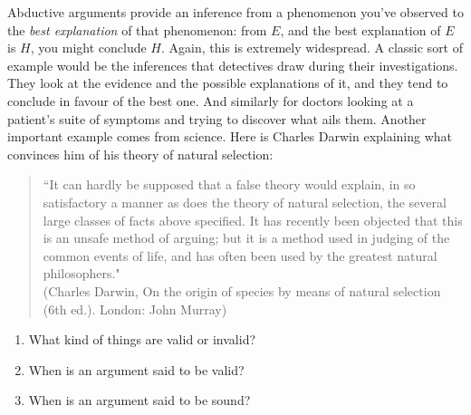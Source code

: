 Abductive arguments provide an inference from a phenomenon you've observed to the \emph{best explanation} of that phenomenon: from $E$, and the best explanation of $E$ is $H$, you might conclude $H$. Again, this is extremely widespread. A classic sort of example would be the inferences that detectives draw during their investigations. They look at the evidence and the possible explanations of it, and they tend to conclude in favour of the best one. And similarly for doctors looking at a patient's suite of symptoms and trying to discover what ails them. Another important example comes from science. Here is Charles Darwin explaining what convinces him of his theory of natural selection: 
\begin{quotation}
``It can hardly be supposed that a false theory would explain, in so satisfactory a manner as does the theory of natural selection, the several large classes of facts above specified. It has recently been objected that this is an unsafe method of arguing; but it is a method used in judging of the common events of life, and has often been used by the greatest natural philosophers."\\ (Charles Darwin, On the origin of species by means of natural selection (6th ed.).
London: John Murray)
\end{quotation}








\practiceproblems
\problempart
\begin{enumerate}
\item What kind of things are valid or invalid?
\item When is an argument said to be valid?
\item When is an argument said to be sound?
\end{enumerate}

